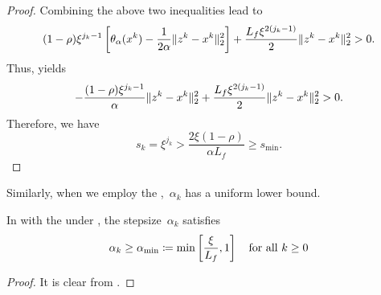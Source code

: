 \documentclass[../../main]{subfiles}
\begin{document}
\begin{proof}
    Combining the above two inequalities lead to
    \begin{equation}
        (1 - \rho) \xi^{j_k - 1} \left[ \theta_\alpha(x^k) - \frac{1}{2 \alpha} \lVert z^k - x^k\rVert_2^2 \right] + \frac{L_f \xi^{2 (j_k - 1)}}{2} \lVert z^k - x^k\rVert_2^2 > 0
    .\end{equation} 
    Thus,  yields
    \begin{equation}
        - \frac{(1 - \rho) \xi^{j_k - 1}}{\alpha} \lVert z^k - x^k\rVert_2^2 + \frac{L_f \xi^{2 (j_k - 1)}}{2} \lVert z^k - x^k\rVert_2^2 > 0
    .\end{equation} 
    Therefore, we have
    \begin{equation}
        s_k = \xi^{j_k} > \frac{2 \xi (1 - \rho)}{\alpha L_f} \ge s_{\min}
    .\end{equation}
\end{proof}

Similarly, when we employ the ,~$\alpha_k$ has a uniform lower bound.
\begin{lemma} 
    In  with the  under , the stepsize~$\alpha_k$ satisfies
    \begin{equation}
        \alpha_k \ge \alpha_{\min} \coloneqq \min \left[\frac{\xi}{L_f}, 1\right] \quad \text{for all~$k \ge 0$}
    \end{equation}
\end{lemma}
\begin{proof}
    It is clear from .
\end{proof}
\end{document}
